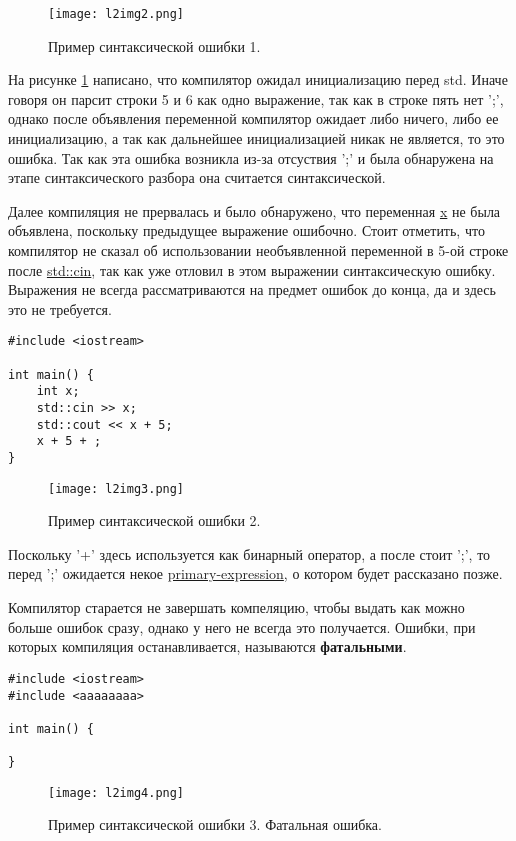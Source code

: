 \begin{figure}[h]
    \centering
    \texttt{[image: l2img2.png]}
    \caption{Пример синтаксической ошибки 1.}
    \label{l2img2}
\end{figure}

На рисунке \ref{l2img2} написано, что компилятор ожидал инициализацию перед std.
Иначе говоря он парсит строки 5 и 6 как одно выражение, так как в строке пять нет ';',
однако после объявления переменной компилятор ожидает либо ничего, либо ее инициализацию,
а так как дальнейшее инициализацией никак не является, то это ошибка. Так как эта ошибка возникла из-за  отсуствия ';' 
и была обнаружена на этапе синтаксического разбора она считается синтаксической.

Далее компиляция не прервалась и было обнаружено, что переменная \underline{x} не была объявлена, поскольку предыдущее выражение ошибочно.
Стоит отметить, что компилятор не сказал об использовании необъявленной переменной в 5-ой строке после \underline{std::cin}, так как уже отловил в этом выражении синтаксическую ошибку.
Выражения не всегда рассматриваются на предмет ошибок до конца, да и здесь это не требуется.

\begin{verbatim}
#include <iostream>

int main() {
    int x;
    std::cin >> x;
    std::cout << x + 5;
    x + 5 + ;
}
\end{verbatim}

\begin{figure}[h]
    \centering
    \texttt{[image: l2img3.png]}
    \caption{Пример синтаксической ошибки 2.}
    \label{l2img3}
\end{figure}

Поскольку '+' здесь используется как бинарный оператор, а после стоит ';', то перед ';' ожидается
некое \underline{primary-expression}, о котором будет рассказано позже.

Компилятор старается не завершать компеляцию, чтобы выдать как можно больше ошибок сразу, однако у него не всегда это получается.
Ошибки, при которых компиляция останавливается, называются \textbf{фатальными}.

\begin{verbatim}
#include <iostream>
#include <aaaaaaaa>

int main() {

}
\end{verbatim}

\begin{figure}[h]
    \centering
    \texttt{[image: l2img4.png]}
    \caption{Пример синтаксической ошибки 3. Фатальная ошибка.}
    \label{l2img4}
\end{figure}

